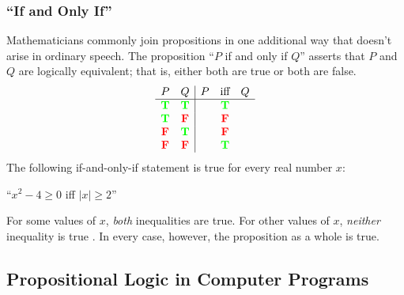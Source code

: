 \subsubsection{``If and Only If''}

Mathematicians commonly join propositions in one additional way that
doesn't arise in ordinary speech.  The proposition ``$P$ if and only
if $Q$'' asserts that $P$ and $Q$ are logically equivalent; that is,
either both are true or both are false.
%
\[
\begin{array}{cc|c}
P & Q & P \quad \text{iff} \quad Q \\ \hline
\textcolor{green}{\mathbf{T}} & \textcolor{green}{\mathbf{T}} & \textcolor{green}{\mathbf{T}} \\
\textcolor{green}{\mathbf{T}} & \textcolor{red}{\mathbf{F}} & \textcolor{red}{\mathbf{F}} \\
\textcolor{red}{\mathbf{F}} & \textcolor{green}{\mathbf{T}} & \textcolor{red}{\mathbf{F}} \\
\textcolor{red}{\mathbf{F}} & \textcolor{red}{\mathbf{F}} & \textcolor{green}{\mathbf{T}}
\end{array}
\]
%
The following if-and-only-if statement is true for every real number
$x$:
%
\begin{center}
``$x^2 - 4 \geq 0$ iff $|x| \geq 2$''
\end{center}
%
For some values of $x$, \textit{both} inequalities are true.  For
other values of $x$, \textit{neither} inequality is true .  In every
case, however, the proposition as a whole is true.

\subsection{Propositional Logic in Computer Programs}

